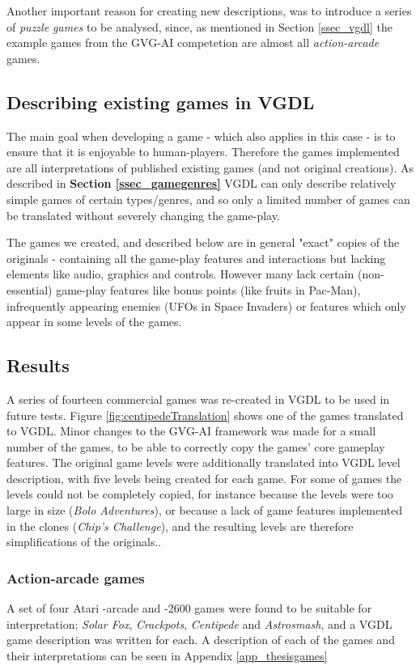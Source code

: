 \documentclass[a4paper,titlepage,final]{report}
\begin{document}
Another important reason for creating new descriptions, was to introduce a series of \emph{puzzle games} to be analysed, since, as mentioned in Section \ref{ssec_vgdl} the example games from the GVG-AI competetion are almost all \textit{action-arcade} games.


\subsection{Describing existing games in VGDL}
The main goal when developing a game - which also applies in this case - is to ensure that it is enjoyable to human-players. 
Therefore the games implemented are all interpretations of published existing games (and not original creations).
As described in \textbf{Section \ref{ssec_gamegenres}} VGDL can only describe relatively simple games of certain types/genres, and so only a limited number of games can be translated without severely changing the game-play.

The games we created, and described below are in general "exact" copies of the originals - containing all the game-play features and interactions but lacking elements like audio, graphics and controls. 
However many lack certain (non-essential) game-play features like bonus points (like fruits in Pac-Man), infrequently appearing enemies (UFOs in Space Invaders) or features which only appear in some levels of the games.


\subsection{Results}
A series of fourteen commercial games was re-created in VGDL to be used in future tests. 
Figure \ref{fig:centipedeTranslation} shows one of the games translated to VGDL.
Minor changes to the GVG-AI framework was made for a small number of the games, to be able to correctly copy the games' core gameplay features.
The original game levels were additionally translated into VGDL level description, with five levels being created for each game.
For some of games the levels could not be completely copied, for instance because the levels were too large in size (\textit{Bolo Adventures}), or because a lack of game features implemented in the clones (\textit{Chip's Challenge}), and the resulting levels are therefore simplifications of the originals..

\subsubsection*{Action-arcade games}
A set of four Atari -arcade and -2600 games were found to be suitable for interpretation; \textit{Solar Fox}, \textit{Crackpots}, \textit{Centipede} and \textit{Astrosmash}, and a VGDL game description was written for each. 
A description of each of the games and their interpretations can be seen in Appendix \ref{app_thesisgames}
\end{document}
